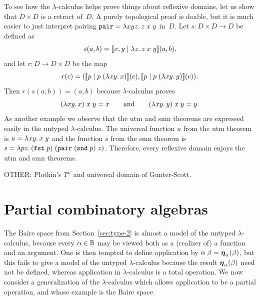 To see how the $\lambda$-calculus helps prove things about reflexive
domains, let us show that $D \times D$ is a retract of~$D$. A purely
topological proof is doable, but it is much easier to just interpret
pairing $\mathtt{pair} = \lambda x y z .\,z\;x\;y$ in~$D$. Let $s : D
\times D \to D$ be defined as
%
\begin{equation*}
  s (a, b) = [\![x,y \mid \lambda z .\,z\;x\;y]\!](a,b),
\end{equation*}
%
and let $r : D \to D \times D$ be the map
%
\begin{equation*}
  r(c) = ([\![p \mid p\;(\lambda x y .\,x)]\!](c),
          [\![p \mid p\;(\lambda x y .\,y)]\!](c)).
\end{equation*}
%
Then $r (s (a, b)) = (a, b)$ because $\lambda$-calculus proves
%
\begin{equation*}
  (\lambda x y .\,x)\; x \; y = x
  \qquad\text{and}\qquad
  (\lambda x y .\,y)\; x \; y = y.
\end{equation*}
%
As another example we observe that the utm and smn theorems are
expressed easily in the untyped $\lambda$-calculus. The universal
function $u$ from the utm theorem is $u = \lambda x y .\,x\; y$ and the
function $s$ from the smn theorem is $s = \lambda p
  z .\,(\mathtt{fst}\;p)\;(\mathtt{pair}\;(\mathtt{snd}\; p)\;z)$.
Therefore, every reflexive domain enjoys the utm and smn theorems.


OTHER: Plotkin's $T^\omega$ and universal domain of Gunter-Scott.


\section{Partial combinatory algebras}
\label{sec:pcas}

The Baire space from Section~\ref{sec:type-2} is almost a model of the
untyped $\lambda$-calculus, because every $\alpha \in \mathbb{B}$ may be
viewed both as a (realizer of) a function and an argument. One is then
tempted to define application by $\alpha \; \beta =
\text{\boldmath{$\eta$}}_{\alpha}(\beta)$, but this fails to give a model of the untyped
$\lambda$-calculus because the result $\text{\boldmath{$\eta$}}_{\alpha}(\beta)$ need not
be defined, whereas application in $\lambda$-calculus is a total
operation. We now consider a generalization of the $\lambda$-calculus
which allows application to be a partial operation, and whose example
is the Baire space.

